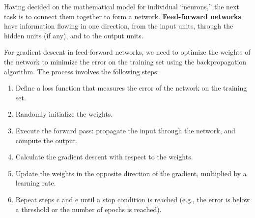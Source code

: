 \documentclass[12pt]{article}
\begin{document}
\begin{enumerate}[label=\textbf{ML.\arabic*}]
          Having decided on the mathematical model for individual “neurons,” the next task is to connect them together to form a network. \textbf{Feed-forward networks} have information flowing in one direction, from the input units, through the hidden units (if any), and to the output units.

          For gradient descent in feed-forward networks, we need to optimize the weights of the network to minimize the error on the training set using the backpropagation algorithm. The process involves the following steps:
          \begin{enumerate}
              \item Define a loss function that measures the error of the network on the training set.
              \item Randomly initialize the weights.
              \item Execute the forward pass: propagate the input through the network, and compute the output.
              \item Calculate the gradient descent with respect to the weights.
              \item Update the weights in the opposite direction of the gradient, multiplied by a learning rate.
              \item Repeat steps c and e until a stop condition is reached (e.g., the error is below a threshold or the number of epochs is reached).
          \end{enumerate}
\end{enumerate}
\end{document}
